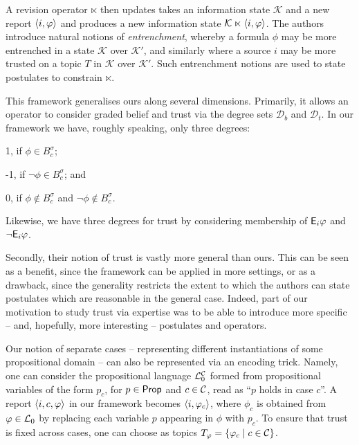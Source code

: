 %
A revision operator $\ltimes$ then updates takes an information state
$\mathcal{K}$ and a new report $\langle {i, \varphi} \rangle$ and produces a new information
state $\mathcal{K} \ltimes \langle {i, \varphi} \rangle$. The authors introduce natural
notions of \emph{entrenchment}, whereby a formula $\phi$ may be more entrenched
in a state $\mathcal{K}$ over $\mathcal{K'}$, and similarly where a source $i$
may be more trusted on a topic $T$ in $\mathcal{K}$ over $\mathcal{K'}$. Such
entrenchment notions are used to state postulates to constrain $\ltimes$.

This framework generalises ours along several dimensions. Primarily, it allows
an operator to consider graded belief and trust via the degree sets
$\mathcal{D}_b$ and $\mathcal{D}_t$. In our framework we have, roughly
speaking, only three degrees:
%
\begin{inlinelist}
    \item 1, if $\phi \in B^\sigma_c$;
    \item -1, if $\neg\phi \in B^\sigma_c$; and
    \item 0, if $\phi \notin B^\sigma_c$ and $\neg\phi \notin B^\sigma_c$.
\end{inlinelist}
Likewise, we have three degrees for trust by considering membership of
$\mathsf{E}_i\varphi$ and $\neg\mathsf{E}_i\varphi$.

Secondly, their notion of trust is vastly more general than ours. This can be
seen as a benefit, since the framework can be applied in more settings, or
as a drawback, since the generality restricts the extent to which the authors
can state postulates which are reasonable in the general case. Indeed, part of
our motivation to study trust via expertise was to be able to introduce more
specific -- and, hopefully, more interesting -- postulates and operators.

Our notion of separate cases -- representing different instantiations of some
propositional domain -- can also be represented via an encoding trick. Namely,
one can consider the propositional language $\mathcal{L}{}_0^{\mathcal{C}}$ formed from
propositional variables of the form $p_c$, for $p \in \mathsf{Prop}$ and $c \in
\mathcal{C}$, read as ``$p$ holds in case $c$''. A report $\langle {i, c, \varphi} \rangle$ in our
framework becomes $\langle {i, \varphi_c} \rangle$, where $\phi_c$ is obtained from $\varphi
\in \mathcal{L}{}_0$ by replacing each variable $p$ appearing in $\phi$ with $p_c$. To
ensure that trust is fixed across cases, one can choose as topics $T_\varphi =
\{\varphi_c \mid c \in \mathcal{C}\}$.

